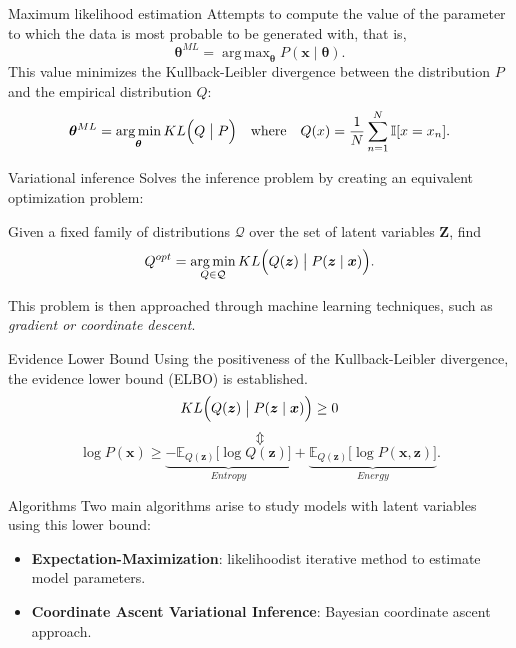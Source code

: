 \documentclass{beamer}
\newcommand{\bx}{\bm{x}}
\newcommand{\bz}{\bm{z}}
\newcommand{\bZ}{\bm{Z}}
\newcommand{\btheta}{\bm{\theta}}
\DeclareMathOperator*{\argmax}{arg\,max}
\DeclareMathOperator*{\argmin}{arg\,min}
\newcommand\E[2]{\mathbb{E}_{#1}\Big[#2\Big]}
\newcommand\KL[2]{KL\Big(#1 \bigm| #2\Big)}
\begin{document}
  \begin{frame}{Maximum likelihood estimation}
    Attempts to compute the value of the parameter to which the data is most probable to be generated with, that is,
    \[
      \btheta^{ML} = \argmax_{\btheta} P(\bx \mid \btheta).
    \]
    This value minimizes the Kullback-Leibler divergence between the distribution \(P\) and the empirical distribution \(Q\):
    \[
      \btheta^{ML} = \argmin_{\btheta} \KL{Q}{P}\quad \text{where}\quad Q(x) = \frac{1}{N}\sum_{n=1}^{N}\mathbb{I}[x = x_{n}].
    \]
  \end{frame}

  \begin{frame}{Variational inference}
    Solves the inference problem by creating an equivalent optimization problem:

    \begin{shaded}
      Given a fixed family of distributions \(\mathcal{Q}\) over the set of latent variables \(\bZ\), find
      \[
        Q^{opt} = \argmin_{Q \in \mathcal{Q}} \KL{Q(\bz)}{P(\bz \mid \bx)}.
      \]
    \end{shaded}

    This problem is then approached through machine learning techniques, such as \emph{gradient or coordinate descent}.
  \end{frame}

  \begin{frame}{Evidence Lower Bound}
    Using the positiveness of the Kullback-Leibler divergence, the evidence lower bound (ELBO) is established.
    \[
      \KL{Q(\bz)}{P(\bz \mid \bx)} \geq 0
    \]
    \[
      \Updownarrow
    \]
    \[
      \log P(\bx) \geq \underbrace{- \E{Q(\bz)}{\log Q(\bz)}}_{Entropy} + \underbrace{\E{Q(\bz)}{\log P(\bx, \bz)}}_{Energy}.
    \]
  \end{frame}

  \begin{frame}{Algorithms}
    Two main algorithms arise to study models with latent variables using this lower bound:
    \begin{itemize}
      \item \textbf{Expectation-Maximization}: likelihoodist iterative method to estimate model parameters.
      \item \textbf{Coordinate Ascent Variational Inference}: Bayesian coordinate ascent approach.
    \end{itemize}
  \end{frame}
\end{document}
